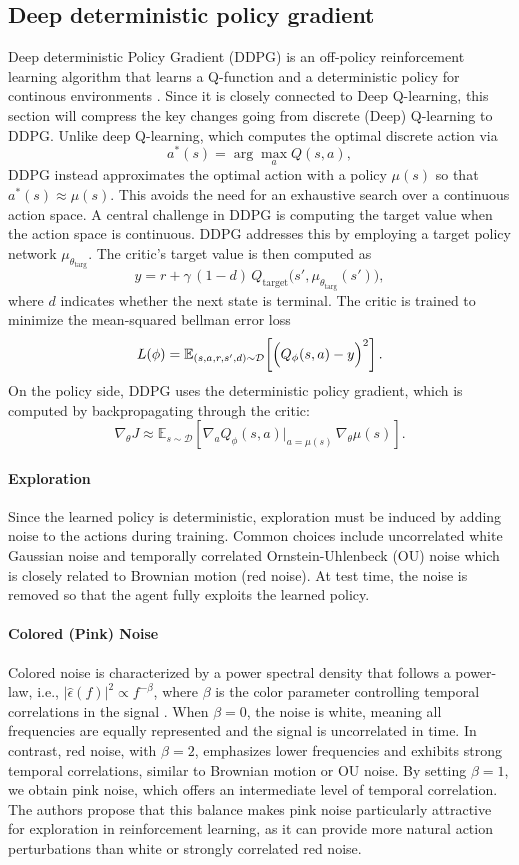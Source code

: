 \subsection{Deep deterministic policy gradient}
Deep deterministic Policy Gradient (DDPG) is an off-policy reinforcement learning algorithm that learns a Q-function and a deterministic policy for continous environments \cite{ddpg_original}. Since it is closely connected to Deep Q-learning, this section will compress the key changes going from discrete (Deep) Q-learning to DDPG. Unlike deep Q-learning, which computes the optimal discrete action via
\[
a^*(s) = \arg\max_a Q(s,a),
\]
DDPG instead approximates the optimal action with a policy \(\mu(s)\) so that \(a^*(s) \approx \mu(s)\). This avoids the need for an exhaustive search over a continuous action space. A central challenge in DDPG is computing the target value when the action space is continuous. DDPG addresses this by employing a target policy network \(\mu_{\theta_{\text{targ}}}\). 
The critic’s target value is then computed as
\[
y = r + \gamma\,(1-d)\,Q_{\text{target}}\bigl(s',\mu_{\theta_{\text{targ}}}(s')\bigr),
\]
where \(d\) indicates whether the next state is terminal. The critic is trained to minimize the mean-squared bellman error loss
\[
L(\phi) = \mathbb{E}_{(s,a,r,s',d)\sim\mathcal{D}}\!\left[\Bigl(Q_\phi(s,a) - y\Bigr)^2\right].
\]
On the policy side, DDPG uses the deterministic policy gradient, which is computed by backpropagating through the critic:
\[
\nabla_{\theta} J \approx \mathbb{E}_{s\sim\mathcal{D}}\!\left[\nabla_a Q_\phi(s,a)\Big|_{a=\mu(s)}\,\nabla_{\theta}\mu(s)\right].
\]

\paragraph{Exploration}
Since the learned policy is deterministic, exploration must be induced by adding noise to the actions during training. Common choices include uncorrelated white Gaussian noise and temporally correlated Ornstein-Uhlenbeck (OU) noise which is closely related to Brownian motion (red noise). At test time, the noise is removed so that the agent fully exploits the learned policy.

\paragraph{Colored (Pink) Noise}
Colored noise is characterized by a power spectral density that follows a power-law, i.e., 
\( |\hat{\epsilon}(f)|^2 \propto f^{-\beta} \),
where \(\beta\) is the color parameter controlling temporal correlations in the signal \cite{eberhard2023pink}. When \(\beta = 0\), the noise is white, meaning all frequencies are equally represented and the signal is uncorrelated in time. In contrast, red noise, with \(\beta = 2\), emphasizes lower frequencies and exhibits strong temporal correlations, similar to Brownian motion or OU noise. By setting \(\beta = 1\), we obtain pink noise, which offers an intermediate level of temporal correlation. The authors propose that this balance makes pink noise particularly attractive for exploration in reinforcement learning, as it can provide more natural action perturbations than white or strongly correlated red noise. 

